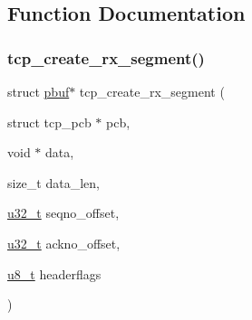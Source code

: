 \subsection{Function Documentation}
\mbox{\label{openmote-cc2538_2lwip_2test_2unit_2tcp_2tcp__helper_8c_a53b3207c8e960cdad9af044b0606a55b}} 
\subsubsection{\texorpdfstring{tcp\+\_\+create\+\_\+rx\+\_\+segment()}{tcp\_create\_rx\_segment()}}
{\footnotesize\ttfamily struct \hyperlink{structpbuf}{pbuf}$\ast$ tcp\+\_\+create\+\_\+rx\+\_\+segment (\begin{DoxyParamCaption}\item[{struct tcp\+\_\+pcb $\ast$}]{pcb,  }\item[{void $\ast$}]{data,  }\item[{size\+\_\+t}]{data\+\_\+len,  }\item[{\hyperlink{group__compiler__abstraction_ga4c14294869aceba3ef9d4c0c302d0f33}{u32\+\_\+t}}]{seqno\+\_\+offset,  }\item[{\hyperlink{group__compiler__abstraction_ga4c14294869aceba3ef9d4c0c302d0f33}{u32\+\_\+t}}]{ackno\+\_\+offset,  }\item[{\hyperlink{group__compiler__abstraction_ga4caecabca98b43919dd11be1c0d4cd8e}{u8\+\_\+t}}]{headerflags }\end{DoxyParamCaption})}

